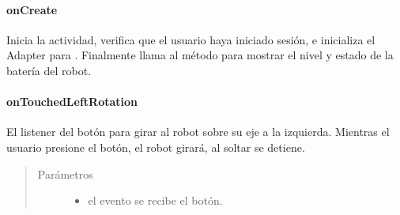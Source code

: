 \paragraph{onCreate}
\label{\detokenize{dev_docs:id14}}

\begin{fulllineitems}
\label{\detokenize{dev_docs:com.lar.cloudnao.RemoteControllerActivity.onCreate(Bundle)}}
Inicia la actividad, verifica que el usuario haya iniciado sesión, e inicializa el Adapter para {\hyperref[\detokenize{dev_docs:com.lar.cloudnao.RemoteControllerActivity.proxiesListView}]{}}. Finalmente llama al método  para mostrar el nivel y estado de la batería del robot.

\end{fulllineitems}



\paragraph{onTouchedLeftRotation}
\label{\detokenize{dev_docs:ontouchedleftrotation}}

\begin{fulllineitems}
\label{\detokenize{dev_docs:com.lar.cloudnao.RemoteControllerActivity.onTouchedLeftRotation(MotionEvent)}}
El listener del botón para girar al robot sobre su eje  a la izquierda. Mientras el usuario presione el botón, el robot girará, al soltar se detiene.
\begin{quote}\begin{description}
\item[{Parámetros}] \leavevmode\begin{itemize}
\item {} 
 \textendash{} el evento se recibe el botón.

\end{itemize}

\end{description}\end{quote}

\end{fulllineitems}



